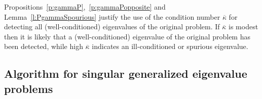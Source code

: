 \documentclass[12pt]{article}
\begin{document}
Propositions~\ref{p:gammaP},~\ref{p:gammaPopposite} and Lemma~\ref{l:PgammaSpourious} justify the use of the condition number $\overline{\kappa}$ for detecting all (well-conditioned) eigenvalues of the original problem. If $\overline{\kappa}$ is modest then it is likely that a (well-conditioned) eigenvalue of the original problem has been detected, while high $\overline{\kappa}$ indicates an ill-conditioned or spurious eigenvalue.

\subsection{Algorithm for singular generalized eigenvalue problems}
\end{document}
